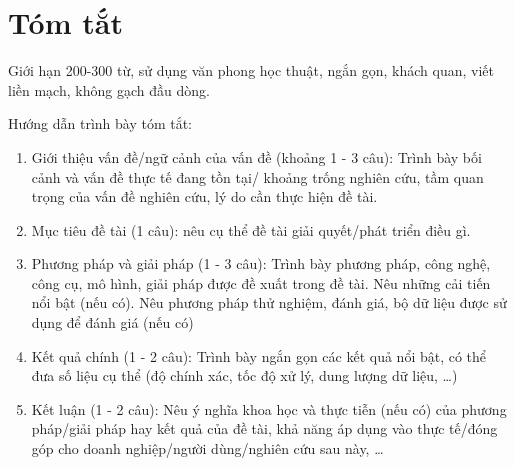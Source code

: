 \chapter*{Tóm tắt}
\label{summary}

Giới hạn 200-300 từ, sử dụng văn phong học thuật, ngắn gọn, khách quan, viết liền mạch, không gạch đầu dòng.

Hướng dẫn trình bày tóm tắt:

\begin{enumerate}
    \item Giới thiệu vấn đề/ngữ cảnh của vấn đề (khoảng 1 - 3 câu): Trình bày bối cảnh và vấn đề thực tế đang tồn tại/ khoảng trống nghiên cứu, tầm quan trọng của vấn đề nghiên cứu, lý do cần thực hiện đề tài.
    \item Mục tiêu đề tài (1 câu): nêu cụ thể đề tài giải quyết/phát triển điều gì.
    \item Phương pháp và giải pháp (1 - 3 câu): Trình bày phương pháp, công nghệ, công cụ, mô hình, giải pháp được đề xuất trong đề tài. Nêu những cải tiến nổi bật (nếu có). Nêu phương pháp thử nghiệm, đánh giá, bộ dữ liệu được sử dụng để đánh giá (nếu có)
    \item Kết quả chính (1 - 2 câu): Trình bày ngắn gọn các kết quả nổi bật, có thể đưa số liệu cụ thể (độ chính xác, tốc độ xử lý, dung lượng dữ liệu, \ldots)
    \item Kết luận (1 - 2 câu): Nêu ý nghĩa khoa học và thực tiễn (nếu có) của phương pháp/giải pháp hay kết quả của đề tài, khả năng áp dụng vào thực tế/đóng góp cho doanh nghiệp/người dùng/nghiên cứu sau này, \ldots
\end{enumerate}